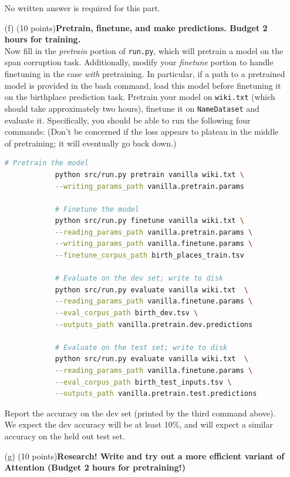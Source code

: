 \documentclass[letterpaper,12pt]{article}
\begin{document}
\begin{itemize}
		No written answer is required for this part.
		
	\item[(f)]
		(10 points)\textbf{Pretrain, finetune, and make predictions. Budget 2 hours for training.}\\
		Now fill in the \textit{pretrain} portion of \texttt{run.py}, which will pretrain a model on the span corruption task. Additionally, modify your \textit{finetune} portion to handle finetuning in the case \textit{with} pretraining. In particular, if a path to a pretrained model is provided in the bash command, load this model before finetuning it on the birthplace prediction task.
		Pretrain your model on \texttt{wiki.txt} (which should take approximately two hours), finetune it on \texttt{NameDataset} and evaluate it. Specifically, you should be able to run the following four commands:
		(Don't be concerned if the loss appears to plateau in the middle of pretraining; it will eventually go back down.)
		\begin{lstlisting}[basicstyle=\ttfamily, language=bash]
			# Pretrain the model
			python src/run.py pretrain vanilla wiki.txt \
			--writing_params_path vanilla.pretrain.params
			
			# Finetune the model
			python src/run.py finetune vanilla wiki.txt \
			--reading_params_path vanilla.pretrain.params \
			--writing_params_path vanilla.finetune.params \
			--finetune_corpus_path birth_places_train.tsv
			
			# Evaluate on the dev set; write to disk
			python src/run.py evaluate vanilla wiki.txt  \
			--reading_params_path vanilla.finetune.params \
			--eval_corpus_path birth_dev.tsv \
			--outputs_path vanilla.pretrain.dev.predictions
			
			# Evaluate on the test set; write to disk
			python src/run.py evaluate vanilla wiki.txt  \
			--reading_params_path vanilla.finetune.params \
			--eval_corpus_path birth_test_inputs.tsv \
			--outputs_path vanilla.pretrain.test.predictions
		\end{lstlisting}
		
		Report the accuracy on the dev set (printed by the third command above). We expect the dev accuracy will be at least 10\%, and will expect a similar accuracy on the held out test set.
		
	\item[(g)]
		(10 points)\textbf{Research! Write and try out a more efficient variant of Attention (Budget 2 hours for pretraining!)}\\
		

\end{itemize}
\end{document}
